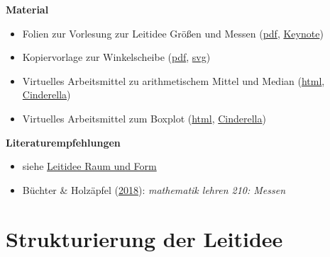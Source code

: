 \documentclass[
]{scrbook}
\providecommand{\tightlist}{%
  \setlength{\itemsep}{0pt}\setlength{\parskip}{0pt}}
\renewenvironment{quote}{
  \list{}{
	\leftmargin0.2cm   %
    \rightmargin\leftmargin
      	\def\FrameCommand
    {%
        {\color{quoteColor}\vrule width 2pt}%
        \hspace{0pt}%
    }%
    \MakeFramed{\advance \hsize -\width \FrameRestore}    \color{quoteColor}
    }
  \item\relax
}
{\endlist\color{black}\endMakeFramed}
\theoremstyle{definition}
\theoremstyle{definition}
\theoremstyle{definition}
\theoremstyle{definition}
\theoremstyle{remark}
\begin{document}
\begin{quote}
\textbf{Material}

\begin{itemize}
\tightlist
\item
  Folien zur Vorlesung zur Leitidee Größen und Messen (\href{files/Stoffdidaktik-WiSe2223-Kap11.pdf}{pdf}, \href{files/Stoffdidaktik-WiSe2223-Kap11.key}{Keynote})
\item
  Kopiervorlage zur Winkelscheibe (\href{files/Stoffdidaktik-WiSe2223-Kap11-Winkelscheibe.pdf}{pdf}, \href{files/Stoffdidaktik-WiSe2223-Kap11-Winkelscheibe.svg}{svg})
\item
  Virtuelles Arbeitsmittel zu arithmetischem Mittel und Median (\href{files/Stoffdidaktik-WiSe2223-Kap11-Lagemasse.html}{html}, \href{files/Stoffdidaktik-WiSe2223-Kap11-Lagemasse.cdy}{Cinderella})
\item
  Virtuelles Arbeitsmittel zum Boxplot (\href{files/Stoffdidaktik-WiSe2223-Kap11-Boxplot.html}{html}, \href{files/Stoffdidaktik-WiSe2223-Kap11-Boxplot.cdy}{Cinderella})
\end{itemize}

\textbf{Literaturempfehlungen}

\begin{itemize}
\tightlist
\item
  siehe \protect\hyperlink{leitidee-raum-und-form}{Leitidee Raum und Form}\\
\item
  Büchter \& Holzäpfel (\protect\hyperlink{ref-Buchter2018}{2018}): \emph{mathematik lehren 210: Messen}
\end{itemize}
\end{quote}

\hypertarget{strukturierung-der-leitidee-groessen-und-messen}{%
\section{Strukturierung der Leitidee}\label{strukturierung-der-leitidee-groessen-und-messen}}
\end{document}
